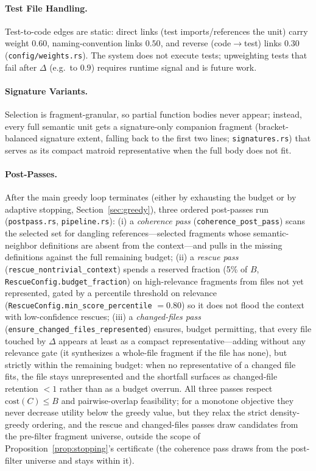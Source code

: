 \documentclass[11pt, a4paper]{article}
\begin{document}
\paragraph{Test File Handling.} Test-to-code edges are static: direct links (test imports/references the unit) carry weight $0.60$, naming-convention links $0.50$, and reverse (code$\to$test) links $0.30$ (\texttt{config/weights.rs}). The system does not execute tests; upweighting tests that fail after $\Delta$ (e.g.\ to $0.9$) requires runtime signal and is future work.

\paragraph{Signature Variants.} Selection is fragment-granular, so partial function bodies never appear; instead, every full semantic unit gets a signature-only companion fragment (bracket-balanced signature extent, falling back to the first two lines; \texttt{signatures.rs}) that serves as its compact matroid representative when the full body does not fit.

\paragraph{Post-Passes.} After the main greedy loop terminates (either by exhausting the budget or by adaptive stopping, Section~\ref{sec:greedy}), three ordered post-passes run (\texttt{postpass.rs}, \texttt{pipeline.rs}): (i) a \emph{coherence pass} (\texttt{coherence\_post\_pass}) scans the selected set for dangling references---selected fragments whose semantic-neighbor definitions are absent from the context---and pulls in the missing definitions against the full remaining budget; (ii) a \emph{rescue pass} (\texttt{rescue\_nontrivial\_context}) spends a reserved fraction (5\% of $B$, \texttt{RescueConfig.budget\_fraction}) on high-relevance fragments from files not yet represented, gated by a percentile threshold on relevance (\texttt{RescueConfig.min\_score\_percentile} $= 0.80$) so it does not flood the context with low-confidence rescues; (iii) a \emph{changed-files pass} (\texttt{ensure\_changed\_files\_represented}) ensures, budget permitting, that every file touched by $\Delta$ appears at least as a compact representative---adding without any relevance gate (it synthesizes a whole-file fragment if the file has none), but strictly within the remaining budget: when no representative of a changed file fits, the file stays unrepresented and the shortfall surfaces as changed-file retention $<1$ rather than as a budget overrun. All three passes respect $\mathrm{cost}(C) \leq B$ and pairwise-overlap feasibility; for a monotone objective they never decrease utility below the greedy value, but they relax the strict density-greedy ordering, and the rescue and changed-files passes draw candidates from the pre-filter fragment universe, outside the scope of Proposition~\ref{prop:stopping}'s certificate (the coherence pass draws from the post-filter universe and stays within it).
\end{document}
